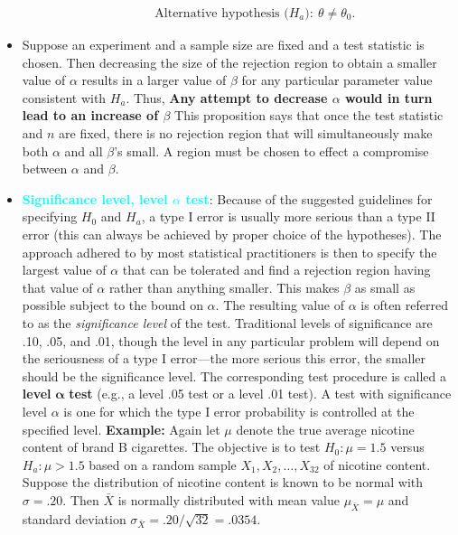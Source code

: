 \documentclass{report}
\begin{document}
\begin{itemize}
\begin{enumerate}
\begin{align*}
                &\text{Alternative hypothesis ($H_{a}$)}:\ \theta \ne \theta_{0} 
            .\end{align*}
    \end{enumerate}
\item Suppose an experiment and a sample size are fixed and a test statistic is chosen. Then decreasing the size of the rejection region to obtain a smaller value of \( \alpha \) results in a larger value of \( \beta \) for any particular parameter value consistent with \( H_a \).
    \bigbreak \noindent 
    Thus, \textbf{Any attempt to decrease $\alpha$ would in turn lead to an increase of $\beta$}
    \bigbreak \noindent 
    This proposition says that once the test statistic and $n$ are fixed, there is no rejection  region that will simultaneously make both $\alpha$ and all $\beta$’s small. A region must be chosen to effect a compromise between $\alpha $ and $\beta$.
\item \textbf{\textcolor{cyan}{Significance level, level $\alpha$ test}}:
    Because of the suggested guidelines for specifying \( H_0 \) and \( H_a \), a type I error is usually more serious than a type II error (this can always be achieved by proper choice of the hypotheses). The approach adhered to by most statistical practitioners is then to specify the largest value of \( \alpha \) that can be tolerated and find a rejection region having that value of \( \alpha \) rather than anything smaller. This makes \( \beta \) as small as possible subject to the bound on \( \alpha \). The resulting value of \( \alpha \) is often referred to as the \textit{significance level} of the test. Traditional levels of significance are .10, .05, and .01, though the level in any particular problem will depend on the seriousness of a type I error---the more serious this error, the smaller should be the significance level. The corresponding test procedure is called a \textbf{level} \( \mathbf{\alpha} \) \textbf{test} (e.g., a level .05 test or a level .01 test). A test with significance level \( \alpha \) is one for which the type I error probability is controlled at the specified level.
    \bigbreak \noindent 
    \textbf{Example:} 
    Again let \( \mu \) denote the true average nicotine content of brand B cigarettes. The objective is to test \( H_0: \mu = 1.5 \) versus \( H_a: \mu > 1.5 \) based on a random sample \( X_1, X_2, \ldots, X_{32} \) of nicotine content. Suppose the distribution of nicotine content is known to be normal with \( \sigma = .20 \). Then \( \bar{X} \) is normally distributed with mean value \( \mu_{\bar{X}} = \mu \) and standard deviation \( \sigma_{\bar{X}} = .20/\sqrt{32} = .0354 \).

\end{itemize}
\end{document}

